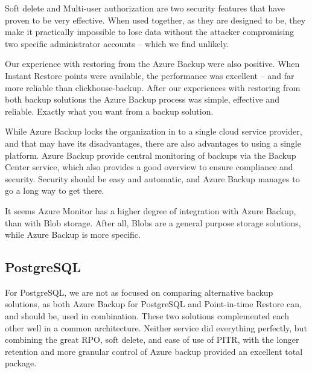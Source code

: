 
Soft delete and Multi-user authorization are two security features that have proven to be very effective. When used together, as they are designed to be, they make it practically impossible to lose data without the attacker compromising two specific administrator accounts -- which we find unlikely.

Our experience with restoring from the Azure Backup were also positive. When Instant Restore points were available, the performance was excellent -- and far more reliable than clickhouse-backup. After our experiences with restoring from both backup solutions the Azure Backup process was simple, effective and reliable. Exactly what you want from a backup solution. 

While Azure Backup locks the organization in to a single cloud service provider,
and that may have its disadvantages, there are also advantages to using a single platform.
Azure Backup provide central monitoring of backups via the Backup Center service, which also provides a good overview to ensure compliance and security. Security should be easy and automatic, and Azure Backup manages to go a long way to get there. 

It seems Azure Monitor has a higher degree of integration with Azure Backup, than with Blob storage. After all, Blobs are a general purpose storage solutions, while Azure Backup is more specific.

\subsection{PostgreSQL}
For PostgreSQL, we are not as focused on comparing alternative backup solutions, as both Azure Backup for PostgreSQL and Point-in-time Restore can, and should be, used in combination. These two solutions complemented each other well in a common architecture. Neither service did everything perfectly, but combining the great RPO, soft delete, and ease of use of PITR, with the longer retention and more granular control of Azure backup provided an excellent total package. 

